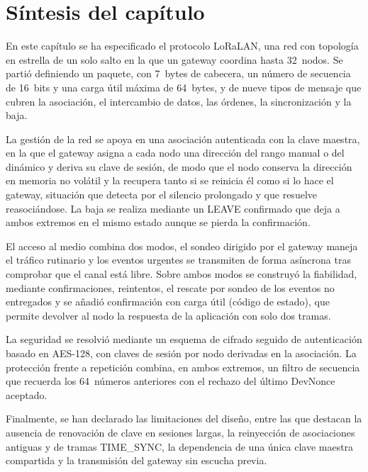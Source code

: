 \section{Síntesis del capítulo}


En este capítulo se ha especificado el protocolo LoRaLAN, una red con topología en estrella de un solo salto en la que un gateway coordina hasta 32~nodos. Se partió definiendo un paquete, con 7~bytes de cabecera, un número de secuencia de 16~bits y una carga útil máxima de 64~bytes, y de nueve tipos de mensaje que cubren la asociación, el intercambio de datos, las órdenes, la sincronización y la baja.

La gestión de la red se apoya en una asociación autenticada con la clave maestra, en la que el gateway asigna a cada nodo una dirección del rango manual o del dinámico y deriva su clave de sesión, de modo que el nodo conserva la dirección en memoria no volátil y la recupera tanto si se reinicia él como si lo hace el gateway, situación que detecta por el silencio prolongado y que resuelve reasociándose. La baja se realiza mediante un LEAVE confirmado que deja a ambos extremos en el mismo estado aunque se pierda la confirmación.

El acceso al medio combina dos modos, el sondeo dirigido por el gateway maneja el tráfico rutinario y los eventos urgentes se transmiten de forma asíncrona tras comprobar que el canal está libre. Sobre ambos modos se construyó la fiabilidad, mediante confirmaciones, reintentos, el rescate por sondeo de los eventos no entregados y se añadió confirmación con carga útil (código de estado), que permite devolver al nodo la respuesta de la aplicación con solo dos tramas.

La seguridad se resolvió mediante un esquema de cifrado seguido de autenticación basado en AES-128, con claves de sesión por nodo derivadas en la asociación. La protección frente a repetición combina, en ambos extremos, un filtro de secuencia que recuerda los 64~números anteriores con el rechazo del último DevNonce aceptado.

Finalmente, se han declarado las limitaciones del diseño, entre las que destacan la ausencia de renovación de clave en sesiones largas, la reinyección de asociaciones antiguas y de tramas TIME\_SYNC, la dependencia de una única clave maestra compartida y la transmisión del gateway sin escucha previa. 